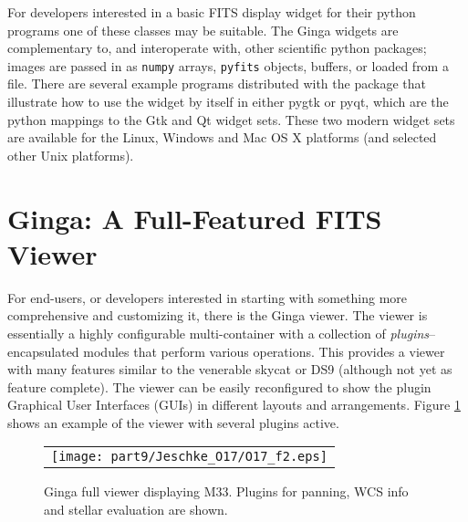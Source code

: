 For developers interested in a basic FITS display widget for their python programs one of these classes may be suitable. The Ginga widgets are complementary to, and interoperate with, other scientific python packages; images are passed in as {\tt {}numpy} arrays, {\tt {}pyfits} objects, buffers, or loaded from a file. There are several example programs distributed with the package that illustrate how to use the widget by itself in either pygtk or pyqt, which are the python mappings to the Gtk and Qt widget sets. These two modern widget sets are available for the Linux, Windows and Mac OS X platforms (and selected other Unix platforms).

\section{Ginga: A Full-Featured FITS Viewer}
For end-users, or developers interested in starting with something more comprehensive and customizing it, there is the Ginga viewer.  The viewer is essentially a highly configurable multi-container with a collection of \emph{plugins}--encapsulated modules that perform various operations. This provides a viewer with many features similar to the venerable skycat \citep{skycat} or DS9 (although not yet as feature complete). The viewer can be easily reconfigured to show the plugin Graphical User Interfaces (GUIs) in different layouts and arrangements. Figure \ref{fig:ginga} shows an example of the viewer with several plugins active. 
\begin{figure}
  \begin{center}
    \begin{tabular}{c}
      \texttt{[image: part9/Jeschke\_O17/O17\_f2.eps]}
    \end{tabular}
  \end{center}
  \caption[example] 
          { \label{fig:ginga} 
            Ginga full viewer displaying M33. Plugins for panning, WCS info and stellar evaluation are shown.} 
\end{figure} 

